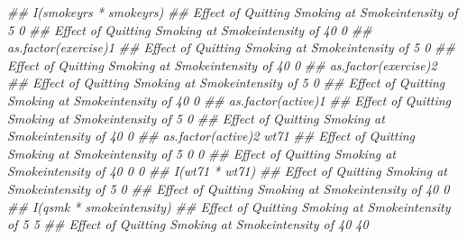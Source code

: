 \documentclass[
  10pt,
  a4paper,
]{book}
\newenvironment{Shaded}{\begin{snugshade}}{\end{snugshade}}
\newcommand{\DocumentationTok}[1]{\textcolor[rgb]{0.37,0.37,0.37}{\textit{#1}}}
\begin{document}
\begin{Shaded}
\begin{Highlighting}[]
\DocumentationTok{\#\#                                                    I(smokeyrs * smokeyrs)}
\DocumentationTok{\#\# Effect of Quitting Smoking at Smokeintensity of 5                       0}
\DocumentationTok{\#\# Effect of Quitting Smoking at Smokeintensity of 40                      0}
\DocumentationTok{\#\#                                                    as.factor(exercise)1}
\DocumentationTok{\#\# Effect of Quitting Smoking at Smokeintensity of 5                     0}
\DocumentationTok{\#\# Effect of Quitting Smoking at Smokeintensity of 40                    0}
\DocumentationTok{\#\#                                                    as.factor(exercise)2}
\DocumentationTok{\#\# Effect of Quitting Smoking at Smokeintensity of 5                     0}
\DocumentationTok{\#\# Effect of Quitting Smoking at Smokeintensity of 40                    0}
\DocumentationTok{\#\#                                                    as.factor(active)1}
\DocumentationTok{\#\# Effect of Quitting Smoking at Smokeintensity of 5                   0}
\DocumentationTok{\#\# Effect of Quitting Smoking at Smokeintensity of 40                  0}
\DocumentationTok{\#\#                                                    as.factor(active)2 wt71}
\DocumentationTok{\#\# Effect of Quitting Smoking at Smokeintensity of 5                   0    0}
\DocumentationTok{\#\# Effect of Quitting Smoking at Smokeintensity of 40                  0    0}
\DocumentationTok{\#\#                                                    I(wt71 * wt71)}
\DocumentationTok{\#\# Effect of Quitting Smoking at Smokeintensity of 5               0}
\DocumentationTok{\#\# Effect of Quitting Smoking at Smokeintensity of 40              0}
\DocumentationTok{\#\#                                                    I(qsmk * smokeintensity)}
\DocumentationTok{\#\# Effect of Quitting Smoking at Smokeintensity of 5                         5}
\DocumentationTok{\#\# Effect of Quitting Smoking at Smokeintensity of 40                       40}


\end{Highlighting}
\end{Shaded}
\end{document}
